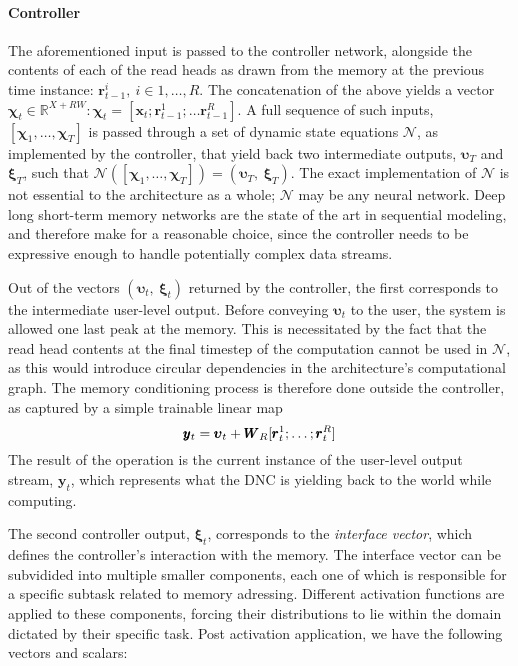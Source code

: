\documentclass[]{article}
\begin{document}
\paragraph{Controller}
The aforementioned input is passed to the controller network, alongside the contents of each of the read heads as drawn from the memory at the previous time instance: $\pmb{r}_{t-1}^{i},\ i \in 1, \dots ,R$. The concatenation of the above yields a vector $\pmb{\chi}_t \in \mathbb{R}^{X + RW}: \pmb{\chi}_t = [\pmb{x}_t; \pmb{r}_{t-1}^1; \dots \pmb{r}_{t-1}^R ] $. A full sequence of such inputs, $[\pmb{\chi}_1,\dots ,\pmb{\chi}_T]$ is passed through a set of dynamic state equations $\mathcal{N}$, as implemented by the controller, that yield back two intermediate outputs, $\pmb{\upsilon }_T$ and $\pmb{\xi}_T$, such that $\mathcal{N}([\pmb{\chi}_1,\dots,\pmb{\chi}_T]) = (\pmb{\upsilon}_T,\ \pmb{\xi}_T)$. The exact implementation of $\mathcal{N}$ is not essential to the architecture as a whole; $\mathcal{N}$ may be any neural network. Deep long short-term memory networks are the state of the art in sequential modeling, and therefore make for a reasonable choice, since the controller needs to be expressive enough to handle potentially complex data streams.

Out of the vectors $(\pmb{\upsilon}_t,\ \pmb{\xi}_t)$ returned by the controller, the first corresponds to the intermediate user-level output. Before conveying $\pmb{\upsilon}_t$ to the user, the system is allowed one last peak at the memory. This is necessitated by the fact that the read head contents at the final timestep of the computation cannot be used in $\mathcal{N}$, as this would introduce circular dependencies in the architecture's computational graph. The memory conditioning process is therefore done outside the controller, as captured by a simple trainable linear map \begin{equation}
\notag
\pmb{y}_t = \pmb{\upsilon}_t + \pmb{W}_R[\pmb{r}_{t}^1;\dots;\pmb{r}_{t}^R]
\label{eqn:Memory Conditioning}
\end{equation}
The result of the operation is the current instance of the user-level output stream, $\pmb{y}_t$, which represents what the DNC is yielding back to the world while computing. 

The second controller output, $\pmb{\xi}_t$, corresponds to the \textit{interface vector}, which defines the controller's interaction with the memory. The interface vector can be subvidided into multiple smaller components, each one of which is responsible for a specific subtask related to memory adressing. Different activation functions are applied to these components, forcing their distributions to lie within the domain dictated by their specific task. Post activation application, we have the following vectors and scalars:
\end{document}
